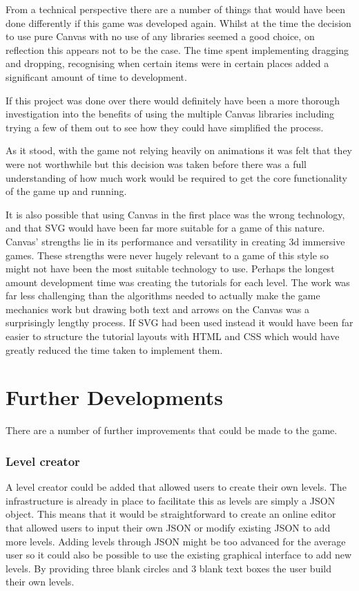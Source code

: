 \documentclass[12pt,a4paper]{report}
\begin{document}
From a technical perspective there are a number of things that would have been done differently if this game was developed again. Whilst at the time the decision to use pure Canvas with no use of any libraries seemed a good choice, on reflection this appears not to be the case. The time spent implementing dragging and dropping, recognising when certain items were in certain places added a significant amount of time to development.

If this project was done over there would definitely have been a more thorough investigation into the benefits of using the multiple Canvas libraries including trying a few of them out to see how they could have simplified the process. 

As it stood, with the game not relying heavily on animations it was felt that they were not worthwhile but this decision was taken before there was a full understanding of how much work would be required to get the core functionality of the game up and running. 

It is also possible that using Canvas in the first place was the wrong technology, and that SVG would have been far more suitable for a game of this nature. Canvas' strengths lie in its performance and versatility in creating 3d immersive games. These strengths were never hugely relevant to a game of this style so might not have been the most suitable technology to use. Perhaps the longest amount development time was creating the tutorials for each level. The work was far less challenging than the algorithms needed to actually make the game mechanics work but drawing both text and arrows on the Canvas was a surprisingly lengthy process. If SVG had been used instead it would have been far easier to structure the tutorial layouts with HTML and CSS which would have greatly reduced the time taken to implement them.




\section{Further Developments}
There are a number of further improvements that could be made to the game.


\subsubsection{Level creator}
A level creator could be added that allowed users to create their own levels. The infrastructure is already in place to facilitate this as levels are simply a JSON object. This means that it would be straightforward to create an online editor that allowed users to input their own JSON or modify existing JSON to add more levels. Adding levels through JSON might be too advanced for the average user so it could also be possible to use the existing graphical interface to add new levels. By providing three blank circles and 3 blank text boxes the user build their own levels. 
\end{document}
